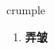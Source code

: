 
\begin{frame}
{\huge crumple}
\begin{center}
\begin{enumerate}\Large
  \item \textbf{弄皱}
\end{enumerate}
\end{center}
\end{frame}
